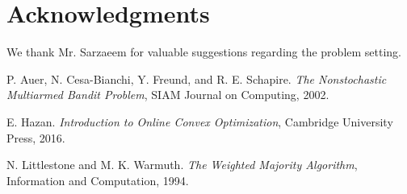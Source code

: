 \documentclass[10pt,twocolumn]{article}
\begin{document}
\section*{Acknowledgments}

We thank Mr. Sarzaeem for valuable suggestions regarding the problem setting.

\begin{thebibliography}{9}

    P. Auer, N. Cesa-Bianchi, Y. Freund, and R. E. Schapire. \emph{The Nonstochastic Multiarmed Bandit Problem}, SIAM Journal on Computing, 2002.

    E. Hazan. \emph{Introduction to Online Convex Optimization}, Cambridge University Press, 2016.

    N. Littlestone and M. K. Warmuth. \emph{The Weighted Majority Algorithm}, Information and Computation, 1994.

\end{thebibliography}
\end{document}
